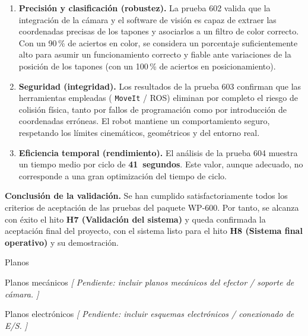 \documentclass[12pt,a4paper]{article}
\makeatletter
\newcommand{\secfmt}[1]{%
  \noindent\colorbox{BlueHeader}{%
    \parbox[b]{\dimexpr\linewidth-2\fboxsep}{%
      \vspace{5pt}%
      \textcolor{white}{\large\bfseries #1}%
      \vspace{5pt}%
    }%
  }\par\vspace{4pt}%
}
\renewcommand\section{%
  \@ifstar\section@star\section@nostar
}
\newcommand\section@nostar[1]{%
  \refstepcounter{section}%
  \addcontentsline{toc}{section}{\protect\numberline{\thesection}#1}%
  \secfmt{\thesection.\enspace #1}%
}
\newcommand\section@star[1]{%
  \secfmt{#1}%
}
\newcommand{\subsecfmt}[1]{%
  {\large\bfseries\color{MediumBlue}#1}%
  \par\vspace{2pt}%
}
\renewcommand\subsection{%
  \@ifstar\subsection@star\subsection@nostar
}
\newcommand\subsection@nostar[1]{%
  \refstepcounter{subsection}%
  \addcontentsline{toc}{subsection}{\protect\numberline{\thesubsection}#1}%
  \vspace{10pt}%
  \subsecfmt{\thesubsection.\enspace #1}%
  \vspace{2pt}%
}
\newcommand\subsection@star[1]{%
  \vspace{10pt}\subsecfmt{#1}\vspace{2pt}%
}
\newcommand{\code}[1]{%
  \begingroup
  \def\_{\char`_\penalty0 }%
  \def\/{\char`/\penalty0 }%
  \texttt{\small #1}%
  \endgroup}
\makeatother
\begin{document}
\begin{enumerate}
  \item \textbf{Precisión y clasificación (robustez).} La prueba 602 valida que la integración de la
        cámara y el software de visión es capaz de extraer las coordenadas precisas de los tapones y
        asociarlos a un filtro de color correcto. Con un 90\,\% de aciertos en color, se considera un
        porcentaje suficientemente alto para asumir un funcionamiento correcto y fiable ante variaciones
        de la posición de los tapones (con un 100\,\% de aciertos en posicionamiento).
  \item \textbf{Seguridad (integridad).} Los resultados de la prueba 603 confirman que las herramientas
        empleadas (\code{MoveIt} / ROS) eliminan por completo el riesgo de colisión física, tanto por
        fallos de programación como por introducción de coordenadas erróneas. El robot mantiene un
        comportamiento seguro, respetando los límites cinemáticos, geométricos y del entorno real.
  \clearpage
  \item \textbf{Eficiencia temporal (rendimiento).} El análisis de la prueba 604 muestra un tiempo medio
        por ciclo de \textbf{41~segundos}. Este valor, aunque adecuado, no corresponde a una gran
        optimización del tiempo de ciclo.
\end{enumerate}

\noindent\textbf{Conclusión de la validación.}
Se han cumplido satisfactoriamente todos los criterios de aceptación de las pruebas del paquete WP-600.
Por tanto, se alcanza con éxito el hito \textbf{H7 (Validación del sistema)} y queda confirmada la
aceptación final del proyecto, con el sistema listo para el hito \textbf{H8 (Sistema final operativo)} y
su demostración.

\clearpage
\section{Planos}

\subsection{Planos mecánicos}
\textit{[ Pendiente: incluir planos mecánicos del efector / soporte de cámara. ]}

\subsection{Planos electrónicos}
\textit{[ Pendiente: incluir esquemas electrónicos / conexionado de E/S. ]}
\end{document}
